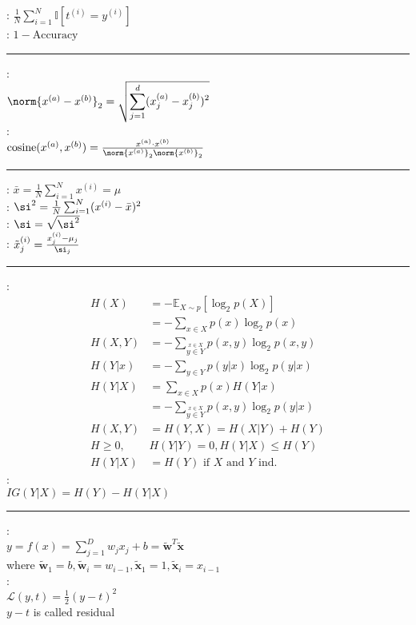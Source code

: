 \documentclass[10pt]{LatexTemplate/hw}
\begin{document}
\begin{multicols*}{5}
\columnbreak
{}: $\frac1N\sum_{i=1}^N \mathbb{I}[t^{(i)} = y^{(i)}]$\\
: $1 - \text{Accuracy}$\\
\rule{\linewidth}{0.4pt}
:\\ $\norm{x^{(a)}-x^{(b)}}_2 = \sqrt{\displaystyle\sum_{j=1}^d(x_j^{(a)}-x_j^{(b)})^2}$\\
:\\
$\operatorname{cosine}(x^{(a)}, x^{(b)}) = \frac{x^{(a)}\cdot x^{(b)}}{\norm{x^{(a)}}_2\norm{x^{(b)}}_2}$\\
\rule{\linewidth}{0.4pt}
: $\bar{x}=\frac1N\sum_{i=1}^Nx^{(i)}=\mu$\\
: $\si^2=\frac1N\sum_{i=1}^N(x^{(i)}-\bar{x})^2$\\
: $\si=\sqrt{\si^2}$\\
: $\tilde{x}^{(i)}_j=\frac{x^{(i)}_j-\mu_j}{\si_j}$\\
\rule{\linewidth}{0.4pt}
:
\begin{align*}
    H(X)&=-\mathbb{E}_{X\sim p}[\log_2 p(X)]\\
    &=-\textstyle\sum_{x\in X}p(x)\log_2p(x)\\
    H(X,Y) &= - \textstyle\sum_{\stackrel{x\in X}{y\in Y}}p(x,y)\log_2p(x,y)\\
    H(Y | x) &= - \textstyle\sum_{y\in Y}p(y|x)\log_2p(y|x)\\
    H(Y|X) &= \textstyle\sum_{x\in X}p(x) H(Y|x)\\
    &= - \textstyle\sum_{\stackrel{x\in X}{y\in Y}}p(x,y)\log_2p(y|x)\\
    H(X,Y)&=H(Y,X)=H(X|Y)+H(Y)\\
    H \ge 0, &H(Y|Y)=0, H(Y|X)\le H(Y)\\
    H(Y|X)&=H(Y) \text{ if $X$ and $Y$ ind. }
\end{align*}
:\\ $IG(Y|X)=H(Y)-H(Y|X)$\\
\rule{\linewidth}{0.4pt}
:\\ $y=f(x)=\sum_{j=1}^D w_j x_j + b=\mathbf{\tilde{w}}^T\mathbf{\tilde{x}}$\\ where $\mathbf{\tilde{w}}_1=b,\mathbf{\tilde{w}}_i=w_{i-1}, \mathbf{\tilde{x}}_1=1, \mathbf{\tilde{x}}_i=x_{i-1}$\\
:\\ $\mathcal{L}(y,t)=\frac12(y-t)^2$\\$y-t$ is called residual\\

\end{multicols*}
\end{document}
